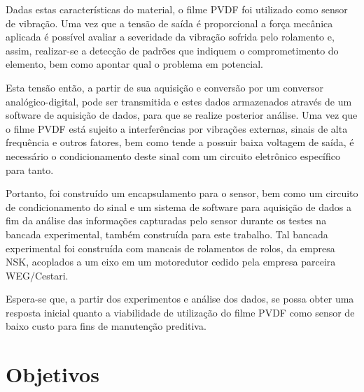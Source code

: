 \documentclass[
	12pt,				
	oneside,			
	a4paper,			
	english,			
	brazil,			
	]{abntex2ppgsi}
\begin{document}
Dadas estas características do material, o filme PVDF foi utilizado como sensor de vibração. Uma vez que a tensão de saída é proporcional a força mecânica aplicada é possível avaliar a severidade da vibração sofrida pelo rolamento e, assim, realizar-se a detecção de padrões que indiquem o comprometimento do elemento, bem como apontar qual o problema em potencial.


Esta tensão então, a partir de sua aquisição e conversão por um conversor analógico-digital, pode ser transmitida e estes dados armazenados através de um software de aquisição de dados, para que se realize posterior análise. Uma vez que o filme PVDF está sujeito a interferências por vibrações externas, sinais de alta frequência e outros fatores, bem como tende a possuir baixa voltagem de saída, é necessário o condicionamento deste sinal com um circuito eletrônico específico para tanto. 

Portanto, foi construído um encapsulamento para o sensor, bem como um circuito de condicionamento do sinal e um sistema de software para aquisição de dados a fim da análise das informações capturadas pelo sensor durante os testes na bancada experimental, também construída para este trabalho. Tal bancada experimental foi construída com mancais de rolamentos de rolos, da empresa NSK, acoplados a um eixo em um motoredutor cedido pela empresa parceira WEG/Cestari. 

Espera-se que, a partir dos experimentos e análise dos dados, se possa obter uma resposta inicial quanto a viabilidade de utilização do filme PVDF como sensor de baixo custo para fins de manutenção preditiva.



\chapter{Objetivos}

\section{}
\end{document}
